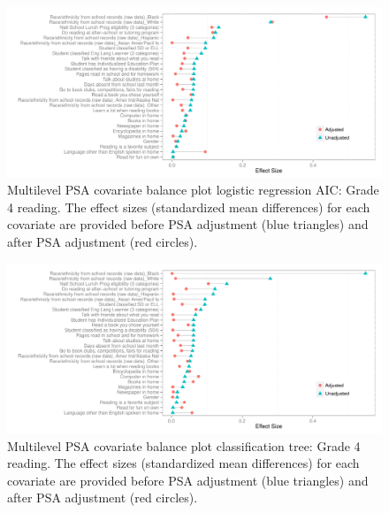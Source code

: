 \begin{figure}[h!]
\begin{center}
\includegraphics[width=\textwidth]{../Figures2009/g4read-mlpsa-lrAIC-balance.pdf}
\caption[Multilevel PSA covariate balance plot logistic regression AIC: Grade 4 reading]{Multilevel PSA covariate balance plot logistic regression AIC: Grade 4 reading. The effect sizes (standardized mean differences) for each covariate are provided before PSA adjustment (blue triangles) and after PSA adjustment (red circles).}
\end{center}
\end{figure}

\begin{figure}[h!]
\begin{center}
\includegraphics[width=\textwidth]{../Figures2009/g4read-mlpsa-ctree-balance.pdf}
\caption[Multilevel PSA covariate balance plot classification tree: Grade 4 reading]{Multilevel PSA covariate balance plot classification tree: Grade 4 reading. The effect sizes (standardized mean differences) for each covariate are provided before PSA adjustment (blue triangles) and after PSA adjustment (red circles).}
\end{center}
\end{figure}

